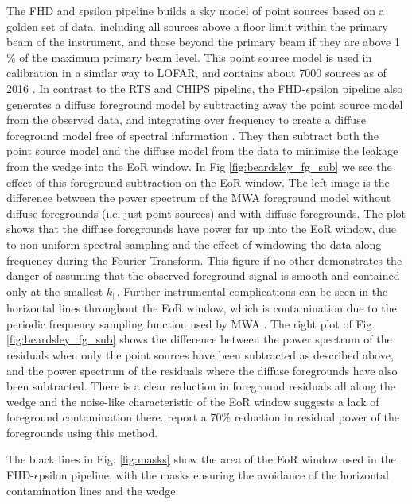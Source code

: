The FHD \citep{Sullivan2012ApJ...759...17S} and $\epsilon$psilon \citep{Barry2019arXiv190102980B} pipeline builds a sky model of point sources based on a golden set of data, including all sources above a floor limit within the primary beam of the instrument, and those beyond the primary beam if they are above 1$\%$ of the maximum primary beam level. This point source model is used in calibration in a similar way to LOFAR, and contains about 7000 sources as of 2016 \citep{Beardsley2016ApJ...833..102B}. In contrast to the RTS \citep{Mitchell2008ISTSP...2..707M} and CHIPS \citep{Trott2016ApJ...818..139T} pipeline, the FHD-$\epsilon$psilon pipeline also generates a diffuse foreground model by subtracting away the point source model from the observed data, and integrating over frequency to create a diffuse foreground model free of spectral information \citep{Beardsley2016ApJ...833..102B}. They then subtract both the point source model and the diffuse model from the data to minimise the leakage from the wedge into the EoR window. In Fig \ref{fig:beardsley_fg_sub} we see the effect of this foreground subtraction on the EoR window. The left image is the difference between the power spectrum of the MWA foreground model without diffuse foregrounds (i.e. just point sources) and with diffuse foregrounds. The plot shows that the diffuse foregrounds have power far up into the EoR window, due to non-uniform spectral sampling and the effect of windowing the data along frequency during the Fourier Transform. This figure if no other demonstrates the danger of assuming that the observed foreground signal is smooth and contained only at the smallest $k_\parallel$. Further instrumental complications can be seen in the horizontal lines throughout the EoR window, which is contamination due to the periodic frequency sampling function used by MWA \citep{Offringa2016MNRAS.458.1057O}. The right plot of Fig. \ref{fig:beardsley_fg_sub} shows the difference between the power spectrum of the residuals when only the point sources have been subtracted as described above, and the power spectrum of the residuals where the diffuse foregrounds have also been subtracted. There is a clear reduction in foreground residuals all along the wedge and the noise-like characteristic of the EoR window suggests a lack of foreground contamination there. \citet{Beardsley2016ApJ...833..102B} report a 70$\%$ reduction in residual power of the foregrounds using this method.

The black lines in Fig. \ref{fig:masks} show the area of the EoR window used in the FHD-$\epsilon$psilon pipeline, with the masks ensuring the avoidance of the horizontal contamination lines and the wedge.

